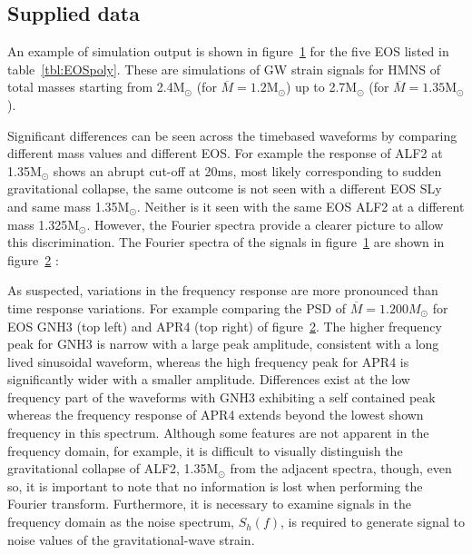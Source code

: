 \subsection{Supplied data}
\label{sec:fEOS}
	An example of simulation output is shown in figure~\ref{fig:hEOS} \citep{Rezzolla2016} for the five EOS listed in table~\ref{tbl:EOSpoly}. These are simulations of GW strain signals for HMNS of total masses starting from 2.4M$_\odot$ (for $\overline{M}=1.2$M$_{\odot}$) up to 2.7M$_{\odot}$ (for $\overline{M}=1.35$M$_{\odot}$).
\begin{figure}[H]
	\begin{center}
		\caption[\protect]{\protect}
		\label{fig:hEOS}
	\end{center}
\end{figure}
	Significant differences can be seen across the timebased waveforms by comparing different mass values and different EOS. For example the response of ALF2 at 1.35M$_{\odot}$ shows an abrupt cut-off at 20ms, most likely corresponding to sudden gravitational collapse, the same outcome is not seen with a different EOS SLy and same mass 1.35M${_\odot}$. Neither is it seen with the same EOS ALF2 at a different mass 1.325M$_{\odot}$. However, the Fourier spectra provide a clearer picture to allow this discrimination. The Fourier spectra of the signals in figure~\ref{fig:hEOS} are shown in figure~\ref{fig:fEOS} \citep{Rezzolla2016}:
\begin{figure}[H]
	\begin{center}
		\adjincludegraphics[height=15cm,trim={0cm 0cm 0cm 0.0cm},clip]{./img/fEOS.png}
		\caption[\protect]{\protect}
		\label{fig:fEOS}
	\end{center}
\end{figure}
	As suspected, variations in the frequency response are more pronounced than time response variations. For example comparing the PSD of $\overline{M}=1.200 M_\odot$ for EOS GNH3 (top left) and APR4 (top right) of figure~\ref{fig:fEOS}. The higher frequency peak for GNH3 is narrow with a large peak amplitude, consistent with a long lived sinusoidal waveform, whereas the high frequency peak for APR4 is significantly wider with a smaller amplitude. Differences exist at the low frequency part of the waveforms with GNH3 exhibiting a self contained peak whereas the frequency response of APR4 extends beyond the lowest shown frequency in this spectrum. Although some features are not apparent in the frequency domain, for example, it is difficult to visually distinguish the gravitational collapse of ALF2, 1.35M$_\odot$ from the adjacent spectra, though, even so, it is important to note that no information is lost when performing the Fourier transform. Furthermore, it is necessary to examine signals in the frequency domain as the noise spectrum, $S_h(f)$, is required to generate signal to noise values of the gravitational-wave strain.
	




